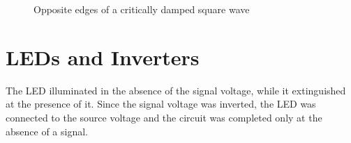 \documentclass[11pt]{article}
\begin{document}
\begin{figure}[h]
	\centering
	\caption{Opposite edges of a critically damped square wave}
	\label{fig:rise_fall}
\end{figure}

\section{LEDs and Inverters}

The LED illuminated in the absence of the signal voltage, while it extinguished at the presence of it. Since the signal voltage was inverted, the LED was connected to the source voltage and the circuit was completed only at the absence of a signal.
\end{document}

